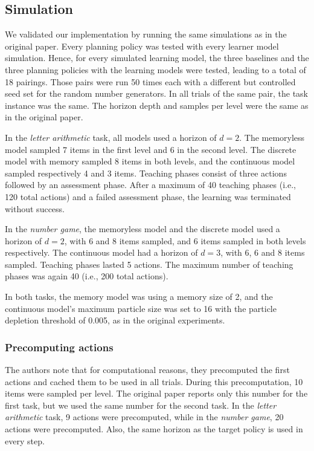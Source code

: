 \subsection{Simulation}

We validated our implementation by running the same simulations as in the original paper. 
Every planning policy was tested with every learner model simulation. 
Hence, for every simulated learning model, the three baselines and the three planning policies with the learning models were tested, leading to a total of 18 pairings.
Those pairs were run 50 times each with a different but controlled seed set for the random number generators. In all trials of the same pair, the task instance was the same. 
The horizon depth and samples per level were the same as in the original paper.

In the \textit{letter arithmetic} task, all models used a horizon of $d=2$. 
The memoryless model sampled 7 items in the first level and 6 in the second level. The discrete model with memory sampled 8 items in both levels, and the continuous model sampled respectively 4 and 3 items.
Teaching phases consist of three actions followed by an assessment phase. After a maximum of 40 teaching phases (i.e., 120 total actions) and a failed assessment phase, the learning was terminated without success.

In the \textit{number game}, the memoryless model and the discrete model used a horizon of $d=2$, with 6 and 8 items sampled, and 6 items sampled in both levels respectively. The continuous model had a horizon of $d=3$, with 6, 6 and 8 items sampled. 
Teaching phases lasted 5 actions. The maximum number of teaching phases was again 40 (i.e., 200 total actions).

In both tasks, the memory model was using a memory size of 2, and the continuous model's maximum particle size was set to 16 with the particle depletion threshold of 0.005, as in the original experiments.

\subsubsection{Precomputing actions}
The authors note that for computational reasons, they precomputed the first actions and cached them to be used in all trials. During this precomputation, 10 items were sampled per level.
The original paper reports only this number for the first task, but we used the same number for the second task. In the \textit{letter arithmetic} task, 9 actions were precomputed, while in the \textit{number game}, 20 actions were precomputed.
Also, the same horizon as the target policy is used in every step.

